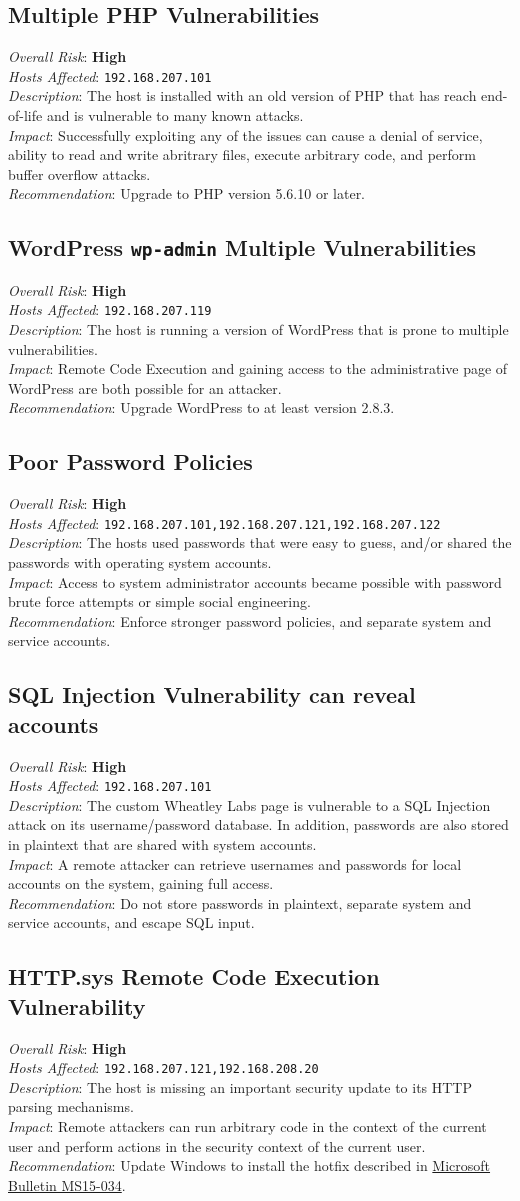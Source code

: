 \documentclass[12pt,titlepage]{article}
\newcommand{\vulnnote}[2]{\noindent \textit{#1}: #2\\}
\newcommand{\risk}[1]{\vulnnote{Overall Risk}{\textbf{#1}}}
\newcommand{\descr}[1]{\vulnnote{Description}{#1}}
\newcommand{\impact}[1]{\vulnnote{Impact}{#1}}
\newcommand{\recommend}[1]{\vulnnote{Recommendation}{#1}}
\newcommand{\hosts}[1]{\vulnnote{Hosts Affected}{\texttt{#1}}}
\newenvironment{vuln}[1]{\subsection{#1}}{}
\newcommand{\msbulletin}[1]{\href{http://technet.microsoft.com/en-us/security/bulletin/#1}{Microsoft Bulletin \MakeTextUppercase{#1}}}
\begin{document}
\begin{vuln}{Multiple PHP Vulnerabilities}
\risk{High}
\hosts{192.168.207.101}
\descr{The host is installed with an old version of PHP that has reach end-of-life and is vulnerable to many known attacks.}
\impact{Successfully exploiting any of the issues can cause a denial of service, ability to read and write abritrary files, execute arbitrary code, and perform buffer overflow attacks.}
\recommend{Upgrade to PHP version 5.6.10 or later.}
\end{vuln}

\begin{vuln}{WordPress \texttt{wp-admin} Multiple Vulnerabilities}
\risk{High}
\hosts{192.168.207.119}
\descr{The host is running a version of WordPress that is prone to multiple vulnerabilities.}
\impact{Remote Code Execution and gaining access to the administrative page of WordPress are both possible for an attacker.}
\recommend{Upgrade WordPress to at least version 2.8.3.}
\end{vuln}

\begin{vuln}{Poor Password Policies}
\risk{High}
\hosts{192.168.207.101,192.168.207.121,192.168.207.122}
\descr{The hosts used passwords that were easy to guess, and/or shared the passwords with operating system accounts.}
\impact{Access to system administrator accounts became possible with password brute force attempts or simple social engineering.}
\recommend{Enforce stronger password policies, and separate system and service accounts.}
\end{vuln}

\begin{vuln}{SQL Injection Vulnerability can reveal accounts}
\risk{High}
\hosts{192.168.207.101}
\descr{The custom Wheatley Labs page is vulnerable to a SQL Injection attack on its username/password database. In addition, passwords are also stored in plaintext that are shared with system accounts.}
\impact{A remote attacker can retrieve usernames and passwords for local accounts on the system, gaining full access.}
\recommend{Do not store passwords in plaintext, separate system and service accounts, and escape SQL input.}
\end{vuln}

\begin{vuln}{HTTP.sys Remote Code Execution Vulnerability}
\risk{High}
\hosts{192.168.207.121,192.168.208.20}
\descr{The host is missing an important security update to its HTTP parsing mechanisms.}
\impact{Remote attackers can run arbitrary code in the context of the current user and perform actions in the security context of the current user.}
\recommend{Update Windows to install the hotfix described in \msbulletin{ms15-034}.}
\end{vuln}
\end{document}
